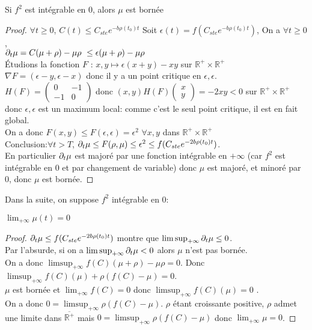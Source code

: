 \begin{lemma} Si $f^2$ est intégrable en 0, alors $\mu$ est bornée
\end{lemma}
\begin{proof} $\forall t\geq 0$, $C(t)\leq C_{ste}e^{-b \rho(t_0)t} $ Soit $\epsilon(t)=f(C_{ste}e^{-b \rho(t_0)t} )$, On a $\forall t\geq 0$,\\ $\partial_t\mu  = C(\mu + \rho) -\mu\rho\ \leq \epsilon(\mu + \rho) -\mu\rho$ \\
Étudions la fonction $F$ : $x,y \mapsto \epsilon(x + y) -xy$ sur $\mathbb{R}^+ \times \mathbb{R}^+$\\
$\nabla F = (\epsilon-y, \epsilon-x)$ donc il y a un point critique en $\epsilon,\epsilon$.\\
$H(F) = \begin{pmatrix}
   0 & -1 \\
   -1 & 0 
\end{pmatrix}$ donc $(x,y)H(F)\begin{pmatrix} x \\ y \end{pmatrix} = -2xy < 0$ sur $\mathbb{R}^+ \times \mathbb{R}^+$ donc $\epsilon,\epsilon$ est un maximum local: comme c'est le seul point critique, il est en fait global.\\
On a donc $F(x,y)\leq F(\epsilon,\epsilon) = \epsilon^2 $ $\forall x,y$ dans $\mathbb{R}^+ \times \mathbb{R}^+$\\
Conclusion:$\forall t>T$,  $\partial_t\mu \leq F(\rho,\mu) \leq  \epsilon^2 \leq f(C_{ste}e^{-2b \rho(t_0)t})$. \\En particulier $\partial_t\mu$ est majoré par une fonction intégrable en $+\infty$ (car $f^2$ est intégrable en 0 et par changement de variable) donc $\mu$ est majoré, et minoré par $0$, donc $\mu$ est bornée.
\end{proof}
Dans la suite, on suppose $f^2$ intégrable en 0:
\begin{lemma} $\lim_{+\infty} \mu(t) = 0$
\end{lemma}
\begin{proof}
$\partial_t\mu \leq f(C_{ste}e^{-2b \rho(t_0)t})$ montre que $\limsup _{+\infty}\partial_t\mu \leq 0$.\\
Par l'absurde, si on a $\limsup _{+\infty}\partial_t\mu <0$ alors $\mu$ n'est pas bornée.\\
On a donc $\limsup_{+\infty}f(C)(\mu + \rho) -\mu\rho = 0$.
Donc $\limsup_{+\infty} f(C)(\mu) + \rho ( f(C)-\mu) = 0$.\\ $\mu$ est bornée et $\lim_{+\infty}f(C)=0$ donc $\limsup_{+\infty} f(C)(\mu) =0$ .\\
On a donc $0=  \limsup_{+\infty} \rho (f(C)-\mu)$. $\rho$ étant croissante positive, $\rho$ admet une limite dans  $\overline{\mathbb{R^+}}$ mais $0=  \limsup_{+\infty} \rho (f(C)-\mu)$ donc $\lim_{+\infty}\mu =0$.
\end{proof} 